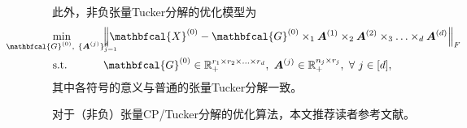 此外，非负张量Tucker分解的优化模型为
\begin{equation*}\label{tk-nn}
	\begin{aligned}
		&\underset{\mathclap{\mathbfcal{G}^{(0)},~\{\boldsymbol{A}^{(j)}\}_{j=1}^{d}}}{\min}\qquad&& {\left\|\mathbfcal{X}^{(0)}-\mathbfcal{G}^{(0)} \times_{1} \boldsymbol{A}^{(1)} \times_{2} \boldsymbol{A}^{(2)} \times_{3} \ldots \times_{d} \boldsymbol{A}^{(d)} \right\|_{F}} \\
		&\text{s.t.} &&\mathbfcal{G}^{(0)}\in\mathbb{R}_{+}^{r_1 \times r_2 \times \ldots \times r_d},~\boldsymbol{A}^{(j)}\in \mathbb{R}_{+}^{n_j \times r_j},~\forall~j\in[d],
	\end{aligned}
\end{equation*}
其中各符号的意义与普通的张量Tucker分解一致。

对于（非负）张量CP/Tucker分解的优化算法，本文推荐读者参考文献。


